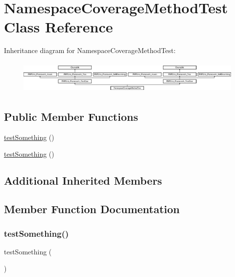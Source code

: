 \hypertarget{class_namespace_coverage_method_test}{}\section{Namespace\+Coverage\+Method\+Test Class Reference}
\label{class_namespace_coverage_method_test}
Inheritance diagram for Namespace\+Coverage\+Method\+Test\+:\begin{figure}[H]
\begin{center}
\leavevmode
\includegraphics[height=1.651917cm]{class_namespace_coverage_method_test}
\end{center}
\end{figure}
\subsection*{Public Member Functions}
\begin{DoxyCompactItemize}
\item 
\mbox{\hyperlink{class_namespace_coverage_method_test_a0fc4e17369bc9607ebdd850d9eda8167}{test\+Something}} ()
\item 
\mbox{\hyperlink{class_namespace_coverage_method_test_a0fc4e17369bc9607ebdd850d9eda8167}{test\+Something}} ()
\end{DoxyCompactItemize}
\subsection*{Additional Inherited Members}


\subsection{Member Function Documentation}
\mbox{\label{class_namespace_coverage_method_test_a0fc4e17369bc9607ebdd850d9eda8167}} 
\subsubsection{\texorpdfstring{test\+Something()}{testSomething()}\hspace{0.1cm}{\footnotesize\ttfamily [1/2]}}
{\footnotesize\ttfamily test\+Something (\begin{DoxyParamCaption}{ }\end{DoxyParamCaption})}


